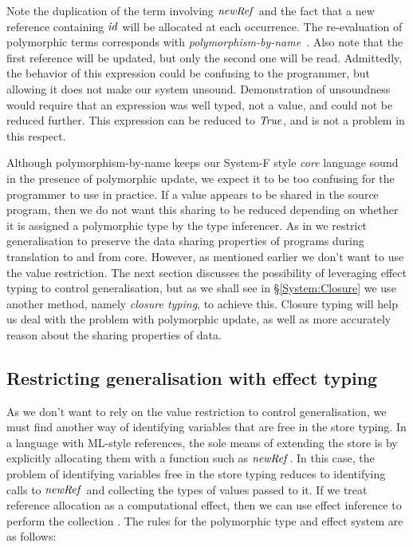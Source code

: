 Note the duplication of the term involving $\operatorname{\mathit{newRef}}$ and the fact that a new reference containing $\operatorname{\mathit{id}}$ will be allocated at each occurrence. The re-evaluation of polymorphic terms corresponds with \emph{polymorphism-by-name}~\cite{leroy:polymorphism-by-name}. Also note that the first reference will be updated, but only the second one will be read. Admittedly, the behavior of this expression could be confusing to the programmer, but allowing it does not make our system unsound. Demonstration of unsoundness would require that an expression was well typed, not a value, and could not be reduced further. This expression can be reduced to $\operatorname{\mathit{True}}$, and is not a problem in this respect.

Although polymorphism-by-name keeps our System-F style \emph{core} language sound in the presence of polymorphic update, we expect it to be too confusing for the programmer to use in practice. If a value appears to be shared in the source program, then we do not want this sharing to be reduced depending on whether it is assigned a polymorphic type by the type inferencer. As in \cite{gifford:integrating} we restrict generalisation to preserve the data sharing properties of programs during translation to and from core. However, as mentioned earlier we don't want to use the value restriction. The next section discusses the possibility of leveraging effect typing to control generalisation, but as we shall see in \S\ref{System:Closure} we use another method, namely \emph{closure typing}, to achieve this. Closure typing will help us deal with the problem with polymorphic update, as well as more accurately reason about the sharing properties of data.


\subsection{Restricting generalisation with effect typing}
As we don't want to rely on the value restriction to control generalisation, we must find another way of identifying variables that are free in the store typing. In a language with ML-style references, the sole means of extending the store is by explicitly allocating them with a function such as $\operatorname{\mathit{newRef}}$. In this case, the problem of identifying variables free in the store typing reduces to identifying calls to $\operatorname{\mathit{newRef}}$ and collecting the types of values passed to it. If we treat reference allocation as a computational effect, then we can use effect inference to perform the collection \cite{wright:references-effect}. The rules for the polymorphic type and effect system \cite{talpin:polymorphic, talpin:discipline} are as follows:

